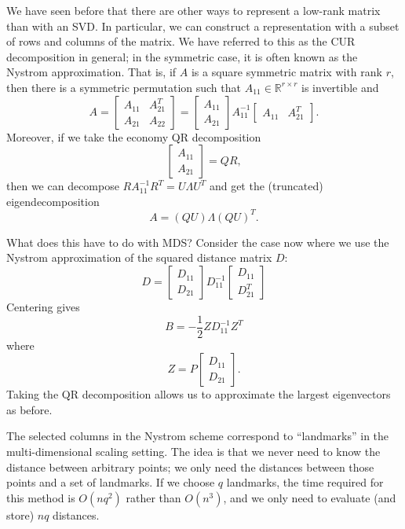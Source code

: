 \documentclass[12pt, leqno]{article} %
\begin{document}
We have seen before that there are other ways to represent a low-rank
matrix than with an SVD.  In particular, we can construct a
representation with a subset of rows and columns of the matrix.  We
have referred to this as the CUR decomposition in general; in the
symmetric case, it is often known as the Nystrom approximation.  That
is, if $A$ is a square symmetric matrix with rank $r$, then there is a
symmetric permutation such that $A_{11} \in \mathbb{R}^{r \times r}$
is invertible and
\[
  A =
  \begin{bmatrix}
    A_{11} & A_{21}^T \\
    A_{21} & A_{22}
  \end{bmatrix} =
  \begin{bmatrix} A_{11} \\ A_{21} \end{bmatrix}
  A_{11}^{-1}
  \begin{bmatrix} A_{11} & A_{21}^T \end{bmatrix}.
\]
Moreover, if we take the economy QR decomposition
\[
  \begin{bmatrix} A_{11} \\ A_{21} \end{bmatrix} = QR,
\]
then we can decompose $R A_{11}^{-1} R^T = U \Lambda U^T$ and get the
(truncated) eigendecomposition
\[
  A = (QU) \Lambda (QU)^T.
\]

What does this have to do with MDS?  Consider the case now where we
use the Nystrom approximation of the squared distance matrix $D$:
\[
D =
\begin{bmatrix} D_{11} \\ D_{21} \end{bmatrix}
D_{11}^{-1}
\begin{bmatrix} D_{11} \\ D_{21}^T \end{bmatrix}
\]
Centering gives
\[
  B = -\frac{1}{2} Z D_{11}^{-1} Z^T
\]
where
\[
  Z = P \begin{bmatrix} D_{11} \\ D_{21} \end{bmatrix}.
\]
Taking the QR decomposition allows us to approximate the largest
eigenvectors as before.

The selected columns in the Nystrom scheme correspond to ``landmarks''
in the multi-dimensional scaling setting.  The idea is that we never
need to know the distance between arbitrary points; we only need the
distances between those points and a set of landmarks.  If we choose
$q$ landmarks, the time required for this method is $O(nq^2)$ rather
than $O(n^3)$, and we only need to evaluate (and store) $nq$
distances.
\end{document}
